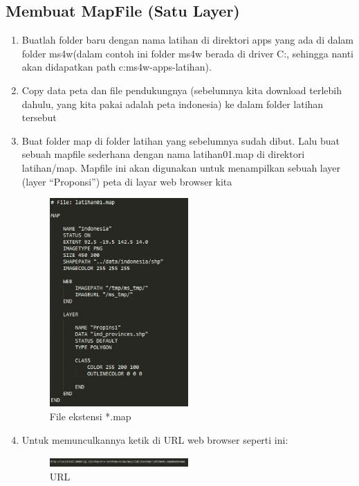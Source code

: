 \subsection {Membuat MapFile (Satu Layer)}
\begin {enumerate}
\item Buatlah folder baru dengan nama latihan di direktori apps yang ada di dalam folder
ms4w(dalam contoh ini folder ms4w berada di driver C:, sehingga nanti akan didapatkan path c:ms4w-apps-latihan). 

\item Copy data peta dan file pendukungnya (sebelumnya kita download terlebih dahulu, yang kita pakai adalah peta indonesia) ke dalam folder latihan tersebut

\item Buat folder map di folder latihan yang sebelumnya sudah dibut. Lalu buat sebuah mapfile sederhana dengan nama latihan01.map di direktori latihan/map. Mapfile ini akan digunakan untuk menampilkan sebuah layer (layer “Proponsi”) peta di layar web browser kita
\begin{figure}[ht]
	    \centerline{\includegraphics[width=0.50\textwidth]{figures/gambar9.JPG}}
	    \caption{File ekstensi *.map}
		\label{gambar9}
		\end{figure}

\item Untuk memunculkannya ketik di URL web browser seperti ini:
\begin{figure}[ht]
	    \centerline{\includegraphics[width=0.50\textwidth]{figures/gambar10.JPG}}
	    \caption{URL}
		\label{gambar10}
		\end{figure}


\end{enumerate}
